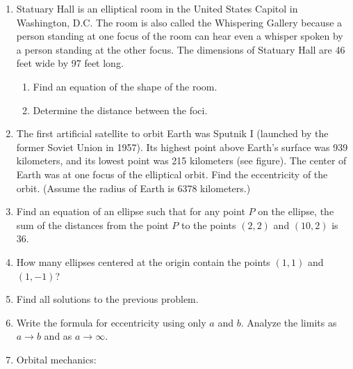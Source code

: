 \documentclass[11pt]{article}
\begin{document}
\begin{enumerate}
\def\labelenumi{\arabic{enumi}.}
\setcounter{enumi}{5}

\item
  Statuary Hall is an elliptical room in the United States Capitol in
  Washington, D.C. The room is also called the Whispering Gallery
  because a person standing at one focus of the room can hear even a
  whisper spoken by a person standing at the other focus. The dimensions
  of Statuary Hall are 46 feet wide by 97 feet long.

  \begin{enumerate}

  \item
    Find an equation of the shape of the room.
  \item
    Determine the distance between the foci.
  \end{enumerate}
\item
  The first artificial satellite to orbit Earth was Sputnik I (launched
  by the former Soviet Union in 1957). Its highest point above Earth's
  surface was 939 kilometers, and its lowest point was 215 kilometers
  (see figure). The center of Earth was at one focus of the elliptical
  orbit. Find the eccentricity of the orbit. (Assume the radius of Earth
  is 6378 kilometers.)
\item
  Find an equation of an ellipse such that for any point \(P\) on the
  ellipse, the sum of the distances from the point \(P\) to the points
  \((2, 2)\) and \((10, 2)\) is 36.
\item
  How many ellipses centered at the origin contain the points \((1,1)\)
  and \((1,-1)\)?
\item
  Find all solutions to the previous problem.
\item
  Write the formula for eccentricity using only \(a\) and \(b\). Analyze
  the limits as \(a \to b\) and as \(a \to \infty\).
\item
  Orbital mechanics:

  \begin{enumerate}


\end{enumerate}
\end{enumerate}
\end{document}
